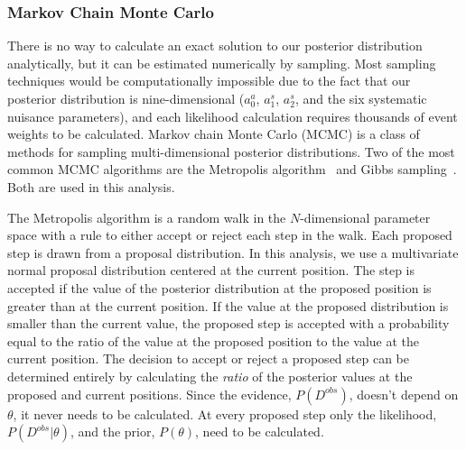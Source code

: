   \subsubsection{Markov Chain Monte Carlo}\label{sec:mcmc}
    There is no way to calculate an exact solution to our posterior
    distribution analytically, but it can be estimated numerically by sampling.
    Most sampling techniques would be computationally impossible due to the
    fact that our posterior distribution is nine-dimensional ($a_0^a$, $a_1^s$,
    $a_2^s$, and the six systematic nuisance parameters), and each likelihood
    calculation requires thousands of event weights to be calculated.  Markov
    chain Monte Carlo (MCMC) is a class of methods for sampling
    multi-dimensional posterior distributions. Two of the most common MCMC
    algorithms are the Metropolis algorithm~\cite{Metropolis:1953am} and Gibbs
    sampling~\cite{Geman:1987}. Both are used in this analysis.

    The Metropolis algorithm is a random walk in the $N$-dimensional parameter
    space with a rule to either accept or reject each step in the walk. Each
    proposed step is drawn from a proposal distribution.  In this analysis, we
    use a multivariate normal proposal distribution centered at the current
    position.  The step is accepted if the value of the posterior distribution
    at the proposed position is greater than at the current position. If the
    value at the proposed distribution is smaller than the current value, the
    proposed step is accepted with a probability equal to the ratio of the
    value at the proposed position to the value at the current position. The
    decision to accept or reject a proposed step can be determined entirely by
    calculating the \textit{ratio} of the posterior values at the proposed and
    current positions. Since the evidence, $P(D^{obs})$, doesn't depend on
    $\theta$, it never needs to be calculated. At every proposed step only the
    likelihood, $P(D^{obs}|\theta)$, and the prior, $P(\theta)$, need to be
    calculated.

